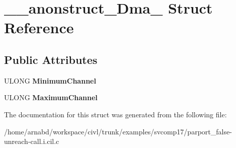 \hypertarget{struct____anonstruct__Dma__28}{}\section{\+\_\+\+\_\+anonstruct\+\_\+\+Dma\+\_ Struct Reference}
\label{struct____anonstruct__Dma__28}
\subsection*{Public Attributes}
\begin{DoxyCompactItemize}
\item 
\hypertarget{struct____anonstruct__Dma__28_af2fa017b2db2d60ca785fe6cc6a4c0e2}{}U\+L\+O\+N\+G {\bfseries Minimum\+Channel}\label{struct____anonstruct__Dma__28_af2fa017b2db2d60ca785fe6cc6a4c0e2}

\item 
\hypertarget{struct____anonstruct__Dma__28_ae5e5d8e56485960c9edffe8a1b1d4a99}{}U\+L\+O\+N\+G {\bfseries Maximum\+Channel}\label{struct____anonstruct__Dma__28_ae5e5d8e56485960c9edffe8a1b1d4a99}

\end{DoxyCompactItemize}


The documentation for this struct was generated from the following file\+:\begin{DoxyCompactItemize}
\item 
/home/arnabd/workspace/civl/trunk/examples/svcomp17/parport\+\_\+false-\/unreach-\/call.\+i.\+cil.\+c\end{DoxyCompactItemize}

